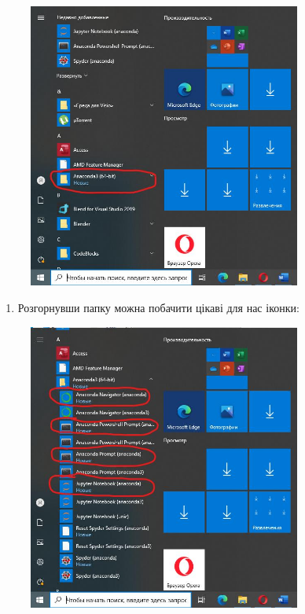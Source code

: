 \documentclass[
  letterpaper,
]{report}
\providecommand{\tightlist}{%
  \setlength{\itemsep}{0pt}\setlength{\parskip}{0pt}}\usepackage{longtable,booktabs,array}
\begin{document}
\begin{figure}

{\centering \includegraphics[width=0.8\textwidth,height=\textheight]{Images/ap1/Screenshot_13.jpg}

}

\end{figure}

\begin{enumerate}
\def\labelenumi{\arabic{enumi}.}
\setcounter{enumi}{12}
\tightlist
\item
  Розгорнувши папку можна побачити цікаві для нас іконки:
\end{enumerate}

\begin{figure}

{\centering \includegraphics[width=0.8\textwidth,height=\textheight]{Images/ap1/Screenshot_14.jpg}

}

\end{figure}
\end{document}
